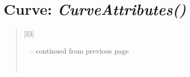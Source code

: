 \documentclass[letterpaper,10pt,english]{sphinxmanual}
\begin{document}
\section{\textbf{Curve}: \emph{CurveAttributes()}}
\label{attributes:curve-curveattributes}
\begin{DUlineblock}{0em}
\item[] 
\end{DUlineblock}
\begin{quote}

\begin{longtable}{|l|l|}
\hline
\endfirsthead

%
{{\textsf{\tablename\ \thetable{} -- continued from previous page}}} \\
\hline
\endhead

\hline {} \\ \hline
\endfoot

\endlastfoot



\end{longtable}
\end{quote}
\end{document}
